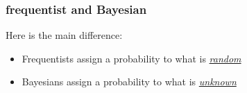 \documentclass{beamer}              %
\begin{document}






\begin{frame}[fragile]
  \frametitle{frequentist and Bayesian}

  Here is the main difference:\\[-0.1in]

  \begin{itemize}
    \item Frequentists assign a probability to what is \underline{\emph{random}} \\[0.2in]
    \item Bayesians assign a probability to what is \underline{\emph{unknown}}
  \end{itemize}
  \vfill

\end{frame}
\end{document}
